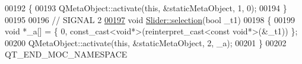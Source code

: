\begin{DoxyCode}
00192 \{
00193     QMetaObject::activate(\textcolor{keyword}{this}, &staticMetaObject, 1, 0);
00194 \}
00195 
00196 \textcolor{comment}{// SIGNAL 2}
\hypertarget{a00070_source_l00197}{}\hyperlink{a00077_a66bf875d43a16cf37527ab75c439fd8e}{00197} \textcolor{keywordtype}{void} \hyperlink{a00077_a66bf875d43a16cf37527ab75c439fd8e}{Slider::selection}(\textcolor{keywordtype}{bool} \_t1)
00198 \{
00199     \textcolor{keywordtype}{void} *\_a[] = \{ 0, \textcolor{keyword}{const\_cast<}\textcolor{keywordtype}{void}*\textcolor{keyword}{>}(\textcolor{keyword}{reinterpret\_cast<}\textcolor{keyword}{const }\textcolor{keywordtype}{void}*\textcolor{keyword}{>}(&\_t1)) \};
00200     QMetaObject::activate(\textcolor{keyword}{this}, &staticMetaObject, 2, \_a);
00201 \}
00202 QT\_END\_MOC\_NAMESPACE
\end{DoxyCode}
